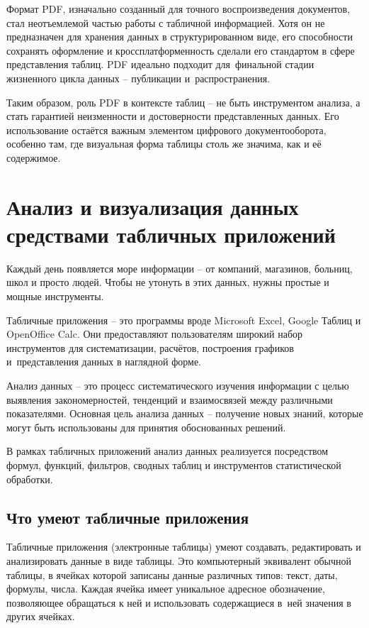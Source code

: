 \documentclass{ou}
\begin{document}
Формат PDF, изначально созданный для точного воспроизведения документов, стал неотъемлемой частью работы с табличной информацией. Хотя он не предназначен для хранения данных в структурированном виде, его способности сохранять оформление и кроссплатформенность сделали его стандартом в сфере представления таблиц. PDF идеально подходит для~финальной стадии жизненного цикла данных -- публикации и~распространения.

Таким образом, роль PDF в контексте таблиц -- не быть инструментом анализа, а стать гарантией неизменности и достоверности представленных данных. Его использование остаётся важным элементом цифрового документооборота, особенно там, где визуальная форма таблицы столь же значима, как и её содержимое.
\newpage
\section{Анализ и визуализация данных средствами табличных приложений}
Каждый день появляется море информации -- от компаний, магазинов, больниц, школ и просто людей. Чтобы не утонуть в этих данных, нужны простые и мощные инструменты.

Табличные приложения -- это программы вроде Microsoft Excel, Google Таблиц и OpenOffice Calc. Они предоставляют пользователям широкий набор инструментов для систематизации, расчётов, построения графиков и~представления данных в наглядной форме.

Анализ данных -- это процесс систематического изучения информации с целью выявления закономерностей, тенденций и взаимосвязей между различными показателями. Основная цель анализа данных -- получение новых знаний, которые могут быть использованы для принятия обоснованных решений.

В рамках табличных приложений анализ данных реализуется посредством формул, функций, фильтров, сводных таблиц и инструментов статистической обработки.
\subsection{Что умеют табличные приложения}
Табличные приложения (электронные таблицы) умеют создавать, редактировать и анализировать данные в виде таблицы. Это компьютерный эквивалент обычной таблицы, в ячейках которой записаны данные различных типов: текст, даты, формулы, числа. Каждая ячейка имеет уникальное адресное обозначение, позволяющее обращаться к ней и использовать содержащиеся в~ней значения в других ячейках.
\end{document}
